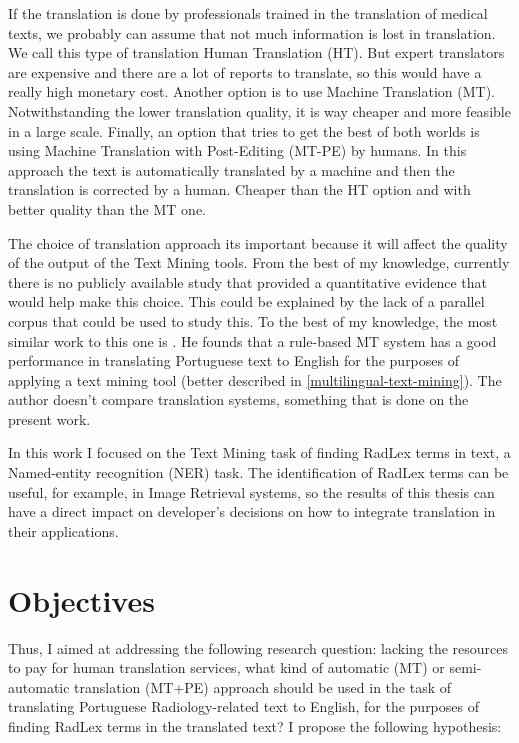 If the translation is done by professionals trained in the translation of medical texts, we probably can assume that not much information is lost in translation. We call this type of translation Human Translation (HT). But expert translators are expensive and there are a lot of reports to translate, so this would have a really high monetary cost. Another option is to use Machine Translation (MT). Notwithstanding the lower translation quality, it is way cheaper and more feasible in a large scale. Finally, an option that tries to get the best of both worlds is using Machine Translation with Post-Editing (MT-PE) by humans. In this approach the text is automatically translated by a machine and then the translation is corrected by a human. Cheaper than the HT option and with better quality than the MT one.

The choice of translation approach its important because it will affect the quality of the output of the Text Mining tools. From the best of my knowledge, currently there is no publicly available study that provided a quantitative evidence that would help make this choice. This could be explained by the lack of a parallel corpus that could be used to study this. To the best of my knowledge, the most similar work to this one is \citep{Castilla2007a}. He founds that a rule-based MT system has a good performance in translating Portuguese text to English for the purposes of applying a text mining tool (better described in \ref{multilingual-text-mining}). The author doesn't compare translation systems, something that is done on the present work.

In this work I focused on the Text Mining task of finding RadLex terms in text, a Named-entity recognition (NER) task. The identification of RadLex terms can be useful, for example, in Image Retrieval \citep{Gerstmair2012} systems, so the results of this thesis can have a direct impact on developer's decisions on how to integrate translation in their applications. 

\section{Objectives}

Thus, I aimed at addressing the following research question: lacking the resources to pay for human translation services, what kind of automatic (MT) or semi-automatic translation (MT+PE) approach should be used in the task of translating Portuguese Radiology-related text to English, for the purposes of finding RadLex terms in the translated text? I propose the following hypothesis:

